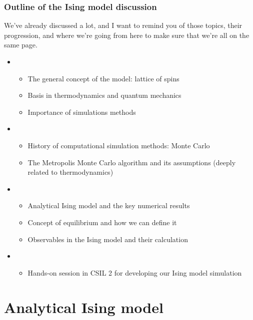 \documentclass[hyperref={colorlinks=true}]{beamer}
\begin{document}
\begin{frame}%
  \frametitle{Outline of the Ising model discussion}

  We've already discussed a lot, and I want to remind you of those topics, their progression, and where we're going from here to make sure that we're all on the same page.
  
  \begin{itemize}
    \item {}
    \begin{itemize}
      \item The general concept of the model: lattice of spins
      \item Basis in thermodynamics and quantum mechanics
      \item Importance of simulations methods
    \end{itemize}
    \item {}
    \begin{itemize}
      \item History of computational simulation methods: Monte Carlo
      \item The Metropolis Monte Carlo algorithm and its assumptions (deeply related to thermodynamics)
    \end{itemize}
    \item {}
    \begin{itemize}
      \item Analytical Ising model and the key numerical results
      \item Concept of equilibrium and how we can define it
      \item Observables in the Ising model and their calculation
    \end{itemize}
    \item {}
    \begin{itemize}
      \item Hands-on session in CSIL 2 for developing our Ising model simulation
    \end{itemize}
  \end{itemize}

\end{frame}

\section[Analytical Ising model]{Analytical Ising model}
\end{document}
